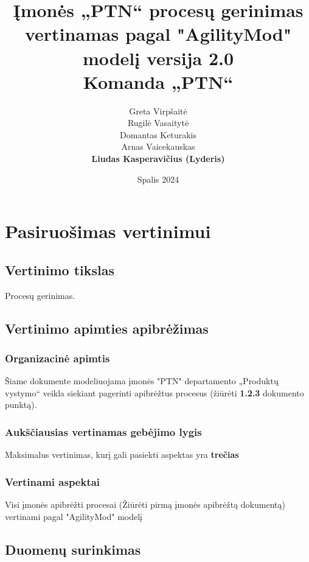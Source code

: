 \documentclass{article}
\title{
    Įmonės „PTN“ procesų gerinimas\\
    \large vertinamas pagal  "AgilityMod" modelį 
    \large versija 2.0 \\
    \large Komanda „PTN“}
\author{
    Greta Virpšaitė \\
    Rugilė Vasaitytė \\
    Domantas Keturakis \\
    Arnas Vaicekauskas \\
    \textbf{Liudas Kasperavičius (Lyderis)} 
}
\date{Spalis 2024}
\begin{document}


\maketitle

\newpage
\tableofcontents

\newpage

\section{Pasiruošimas vertinimui}

\subsection{Vertinimo tikslas}

Procesų gerinimas.

\subsection{Vertinimo apimties apibrėžimas}

\subsubsection{Organizacinė apimtis}
Šiame dokumente modeliuojama įmonės "PTN" departamento „Produktų vystymo“ veikla siekiant pagerinti apibrėžtus procesus (žiūrėti \textbf{1.2.3}  dokumento punktą).

\subsubsection{Aukščiausias vertinamas gebėjimo lygis}

Maksimalus vertinimas, kurį gali pasiekti aspektas yra \textbf{trečias}

\subsubsection{Vertinami aspektai}

Visi įmonės apibrėžti procesai (Žiūrėti pirmą įmonės apibrėžtą dokumentą) vertinami pagal "AgilityMod" modelį


\subsection{Duomenų surinkimas}
\end{document}

